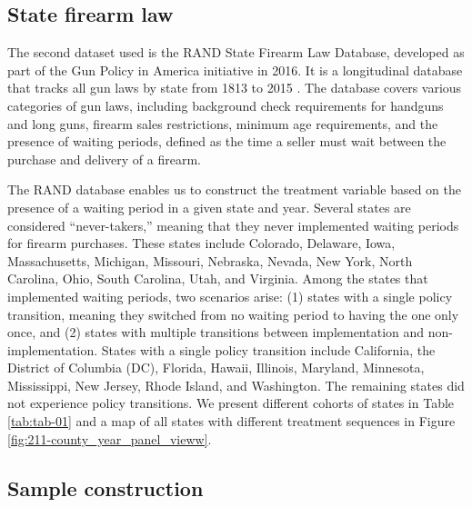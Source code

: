 \subsection*{State firearm law}

The second dataset used is the RAND State Firearm Law Database, developed as part of the Gun Policy in America initiative in 2016. It is a longitudinal database that tracks all gun laws by state from 1813 to 2015 \autocite{cherneyDevelopmentRANDState2022}. The database covers various categories of gun laws, including background check requirements for handguns and long guns, firearm sales restrictions, minimum age requirements, and the presence of waiting periods, defined as the time a seller must wait between the purchase and delivery of a firearm.

The RAND database enables us to construct the treatment variable based on the presence of a waiting period in a given state and year. Several states are considered ``never-takers,'' meaning that they never implemented waiting periods for firearm purchases. These states include Colorado, Delaware, Iowa, Massachusetts, Michigan, Missouri, Nebraska, Nevada, New York, North Carolina, Ohio, South Carolina, Utah, and Virginia. Among the states that implemented waiting periods, two scenarios arise: (1) states with a single policy transition, meaning they switched from no waiting period to having the one only once, and (2) states with multiple transitions between implementation and non-implementation. States with a single policy transition include California, the District of Columbia (DC), Florida, Hawaii, Illinois, Maryland, Minnesota, Mississippi, New Jersey, Rhode Island, and Washington. The remaining states did not experience policy transitions. We present different cohorts of states in Table \ref{tab:tab-01} and a map of all states with different treatment sequences in Figure \ref{fig:211-county_year_panel_vieww}.

\subsection*{Sample construction}


